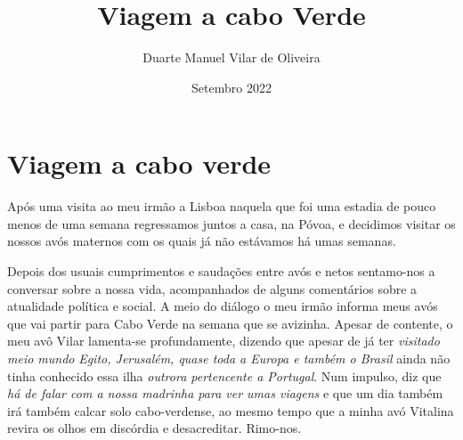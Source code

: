 \documentclass{article}
\title{Viagem a cabo Verde}
\author{Duarte Manuel Vilar de Oliveira }
\date{Setembro  2022}
\begin{document}
\maketitle

\chapter{Viagem a cabo verde}
Após uma visita ao meu irmão a Lisboa \- naquela que foi uma estadia de pouco menos de uma semana regressamos juntos a casa, na Póvoa, e decidimos visitar os nossos avós maternos com os quais já não estávamos há umas semanas.
 
Depois dos usuais cumprimentos e saudações entre avós e netos sentamo-nos a conversar sobre a nossa vida, acompanhados de alguns comentários sobre a atualidade política e social.
A meio do diálogo o meu irmão informa meus avós que vai partir para Cabo Verde na semana que se avizinha.
Apesar de contente, o meu avô Vilar lamenta-se profundamente, dizendo que apesar de já ter \textit{visitado meio mundo} \- \textit{Egito, Jerusalém, quase toda a Europa e também o Brasil} \- ainda não tinha conhecido essa ilha \textit{outrora pertencente a Portugal}.
Num impulso, diz que \textit{há de falar com a nossa madrinha para ver umas viagens} e que um dia também irá também calcar solo cabo-verdense, ao mesmo tempo que a minha avó Vitalina revira os olhos em discórdia e desacreditar. Rimo-nos.
\end{document}
